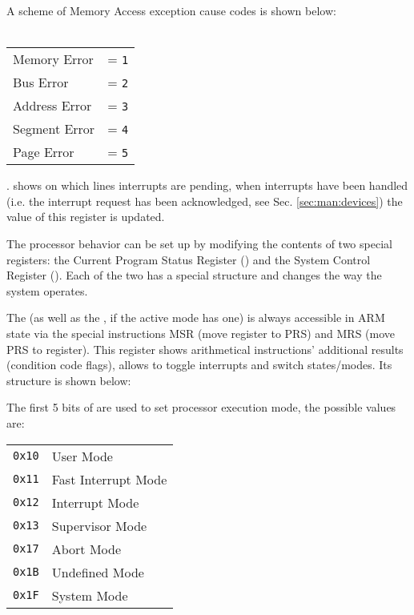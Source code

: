 A scheme of Memory Access exception cause codes is shown below:
\\
\\
\begin{tabular}{ll}
Memory Error & = \texttt{1}\\
Bus Error & = \texttt{2}\\
Address Error & = \texttt{3}\\
Segment Error & = \texttt{4}\\
Page Error & = \texttt{5}\\
\end{tabular}

. shows on which lines interrupts are pending, when interrupts have been handled (i.e. the interrupt request has been acknowledged, see Sec. \ref{sec:man:devices}) the value of this register is updated.


The processor behavior can be set up by modifying the contents of two special registers: the Current Program Status Register () and the System Control Register ().
Each of the two has a special structure and changes the way the system operates.


The  (as well as the , if the active mode has one) is always accessible in ARM state via the special instructions MSR (move register to PRS) and MRS (move PRS to register). This register shows arithmetical instructions' additional results (condition code flags), allows to toggle interrupts and switch states/modes. Its structure is shown below:




The first 5 bits of  are used to set processor execution mode, the possible values are:
\\

\begin{tabular}{r|l}
\texttt{0x10} & User Mode \\
\texttt{0x11} & Fast Interrupt Mode \\
\texttt{0x12} & Interrupt Mode \\
\texttt{0x13} & Supervisor Mode \\
\texttt{0x17} & Abort Mode \\
\texttt{0x1B} & Undefined Mode \\
\texttt{0x1F} & System Mode \\
\end{tabular}
\\

